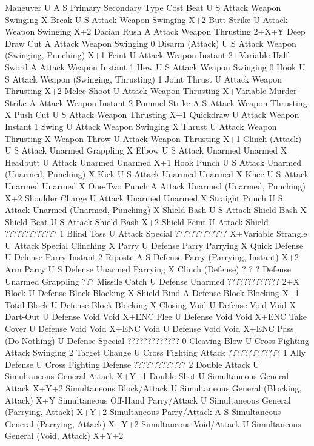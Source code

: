 \documentclass[oneside,11pt,english]{book}
\begin{document}
Maneuver U A S Primary Secondary Type Cost 
Beat U S Attack Weapon Swinging X 
Break U S Attack Weapon Swinging X+2 
Butt-Strike U Attack Weapon Swinging X+2 
Dacian Rush A Attack Weapon Thrusting 2+X+Y 
Deep Draw Cut A Attack Weapon Swinging 0 
Disarm (Attack) U S Attack Weapon (Swinging, Punching) X+1 
Feint U Attack Weapon Instant 2+Variable
Half-Sword A Attack Weapon Instant 1
Hew U S Attack Weapon Swinging 0 
Hook U S Attack Weapon (Swinging, Thrusting) 1
Joint Thrust U Attack Weapon Thrusting X+2
Melee Shoot U Attack Weapon Thrusting X+Variable
Murder-Strike A Attack Weapon Instant 2
Pommel Strike A S Attack Weapon Thrusting X 
Push Cut U S Attack Weapon Thrusting X+1 
Quickdraw U Attack Weapon Instant 1 
Swing U Attack Weapon Swinging X 
Thrust U Attack Weapon Thrusting X 
Weapon Throw U Attack Weapon Thrusting X+1 
Clinch (Attack) U S Attack Unarmed Grappling X 
Elbow U S Attack Unarmed Unarmed X 
Headbutt U Attack Unarmed Unarmed X+1 
Hook Punch U S Attack Unarmed (Unarmed, Punching) X
Kick U S Attack Unarmed Unarmed X 
Knee U S Attack Unarmed Unarmed X 
One-Two Punch A Attack Unarmed (Unarmed, Punching) X+2 
Shoulder Charge U Attack Unarmed Unarmed X 
Straight Punch U S Attack Unarmed (Unarmed, Punching) X
Shield Bash U S Attack Shield Bash X 
Shield Beat U S Attack Shield Bash X+2 
Shield Feint U Attack Shield ????????????? 1 
Blind Toss U Attack Special ????????????? X+Variable 
Strangle U Attack Special Clinching X 
Parry U Defense Parry Parrying X 
Quick Defense U Defense Parry Instant 2 
Riposte A S Defense Parry (Parrying, Instant) X+2 
Arm Parry U S Defense Unarmed Parrying X
Clinch (Defense) ? ? ? Defense Unarmed Grappling ???
Missile Catch U Defense Unarmed ????????????? 2+X 
Block U Defense Block Blocking X 
Shield Bind A Defense Block Blocking X+1 
Total Block U Defense Block Blocking X 
Closing Void U Defense Void Void X 
Dart-Out U Defense Void Void X+ENC 
Flee U Defense Void Void X+ENC 
Take Cover U Defense Void Void X+ENC 
Void U Defense Void Void X+ENC 
Pass (Do Nothing) U Defense Special ????????????? 0 
Cleaving Blow U Cross Fighting Attack Swinging 2 
Target Change U Cross Fighting Attack ????????????? 1 
Ally Defense U Cross Fighting Defense ????????????? 2 
Double Attack U Simultaneous General Attack X+Y+1 
Double Shot U Simultaneous General Attack X+Y+2 
Simultaneous Block/Attack U Simultaneous General (Blocking, Attack) X+Y 
Simultaneous Off-Hand Parry/Attack U Simultaneous General (Parrying, Attack) X+Y+2 
Simultaneous Parry/Attack A S Simultaneous General (Parrying, Attack) X+Y+2 
Simultaneous Void/Attack U Simultaneous General (Void, Attack) X+Y+2 
\end{document}
